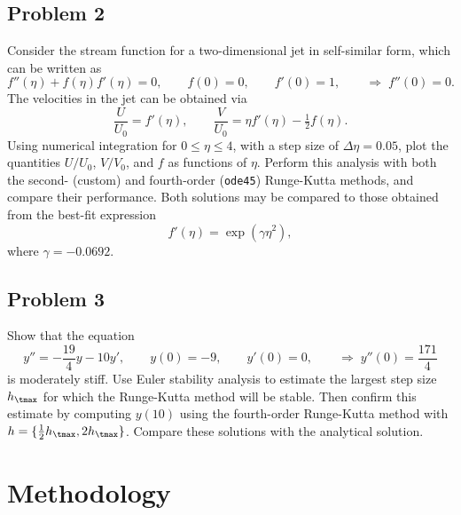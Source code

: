 \documentclass[12pt]{article}
\begin{document}
\subsection{Problem 2}

Consider the stream function for a two-dimensional jet in self-similar form, which can be written as
\begin{equation}
f''(\eta) + f(\eta) f'(\eta) = 0 ,\qquad
f(0) = 0 ,\qquad
f'(0) = 1 ,\qquad
\Rightarrow \;
f''(0) = 0
.
\end{equation}
The velocities in the jet can be obtained via
\begin{equation}
\frac{U}{U_0} = f'(\eta) ,\qquad
\frac{V}{U_0} = \eta f'(\eta) - \tfrac{1}{2} f(\eta)
.
\label{eq:prob2_velocities}
\end{equation}
Using numerical integration for $0 \le \eta \le 4$, with a step size of $\Delta \eta = 0.05$, plot the quantities $U/U_0$, $V/V_0$, and $f$ as functions of $\eta$. Perform this analysis with both the second- (custom) and fourth-order (\lstinline|ode45|) Runge-Kutta methods, and compare their performance. Both solutions may be compared to those obtained from the best-fit expression
\begin{equation}
f'(\eta) = \exp(\gamma \eta^2)
,
\label{eq:prob2_bestfit}
\end{equation}
where $\gamma = -0.0692$.

\subsection{Problem 3}

Show that the equation
\begin{equation}
y'' = -\frac{19}{4} y - 10 y' ,\qquad
y(0) = -9 ,\qquad
y'(0) = 0 ,\qquad
\Rightarrow \;
y''(0) = \frac{171}{4}
\label{eq:prob3}
\end{equation}
is moderately stiff. Use Euler stability analysis to estimate the largest step size $h_\tmax$ for which the Runge-Kutta method will be stable. Then confirm this estimate by computing $y(10)$ using the fourth-order Runge-Kutta method with $h = \{ \tfrac{1}{2} h_\tmax, 2 h_\tmax\}$. Compare these solutions with the analytical solution.

\section{Methodology} %
\end{document}
